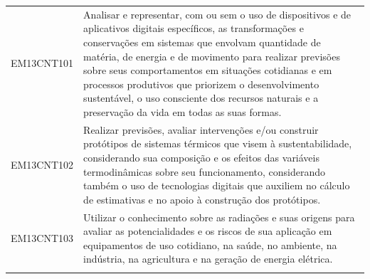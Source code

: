 \documentclass[12pt]{extarticle}
\begin{document}
\begin{longtable}{ll}
EM13CNT101 & Analisar e representar, com ou sem o uso de dispositivos e de aplicativos digitais específicos, as transformações e conservações em sistemas que envolvam quantidade de matéria, de energia e de movimento para realizar previsões sobre seus comportamentos em situações cotidianas e em processos produtivos que priorizem o desenvolvimento sustentável, o uso consciente dos recursos naturais e a preservação da vida em todas as suas formas.                                                                                                                                                                                                                                                                                                                                                                   \\
\rowcolor[HTML]{E0F7FA} 
EM13CNT102 & Realizar previsões, avaliar intervenções e/ou construir protótipos de sistemas térmicos que visem à sustentabilidade, considerando sua composição e os efeitos das variáveis termodinâmicas sobre seu funcionamento, considerando também o uso de tecnologias digitais que auxiliem no cálculo de estimativas e no apoio à construção dos protótipos.                                                                                                                                                                                                                                                                                                                                                                                                                                                                 \\
\rowcolor[HTML]{FFF} 
EM13CNT103 & Utilizar o conhecimento sobre as radiações e suas origens para avaliar as potencialidades e os riscos de sua aplicação em equipamentos de uso cotidiano, na saúde, no ambiente, na indústria, na agricultura e na geração de energia elétrica.                                                                                                                                                                                                                                                                                                                                                                                                                                                                                                                                                                        \\
\rowcolor[HTML]{E0F7FA} 

\end{longtable}
\end{document}
